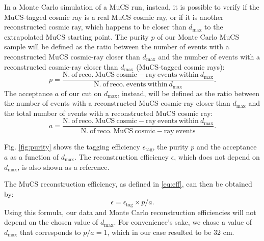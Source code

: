 \documentclass[a4paper]{scrartcl}
\begin{document}
In a Monte Carlo simulation of a MuCS run, instead, it is possible to verify if the MuCS-tagged cosmic ray is a real MuCS cosmic ray, or if it is another reconstructed cosmic ray, which happens to be closer than $d_{\mathrm{max}}$ to the extrapolated MuCS starting point.
The purity $p$ of our Monte Carlo MuCS sample will be defined as the ratio between the number of events with a reconstructed MuCS cosmic-ray closer than $d_{\mathrm{max}}$ and the number of events with a reconstructed cosmic-ray closer than $d_{\mathrm{max}}$ (MuCS-tagged cosmic rays):
\begin{equation}
  p=\frac{\mathrm{N.~of~reco.~MuCS~cosmic-ray~events~within~}d_{\mathrm{max}}}{\mathrm{N.~of~reco.~events~within~}d_{\mathrm{max}}}.
\end{equation}
The acceptance $a$ of our cut on $d_{\mathrm{max}}$, instead, will be defined as the ratio between the number of events with a reconstructed MuCS cosmic-ray closer than $d_{\mathrm{max}}$ and the total number of events with a reconstructed MuCS cosmic ray:
\begin{equation}
  a=\frac{\mathrm{N.~of~reco.~MuCS~cosmic-ray~events~within~}d_{\mathrm{max}}}{\mathrm{N.~of~reco.~MuCS~cosmic-ray~events}}.
\end{equation}

Fig. \ref{fig:purity} shows the tagging efficiency $\epsilon_{\mathrm{tag}}$, the purity $p$ and the acceptance $a$ as a function of $d_{\mathrm{max}}$. The reconstruction efficiency $\epsilon$, which does not depend on $d_{\mathrm{max}}$, is also shown as a reference.

The MuCS reconstruction efficiency, as defined in \eqref{eq:eff}, can then be obtained by:
\begin{equation}
  \epsilon = \epsilon_{\mathrm{tag}} \times p / a.
\end{equation}
Using this formula, our data and Monte Carlo reconstruction efficiencies will not depend on the chosen value of $d_{\mathrm{max}}$. For convenience's sake, we chose a value of $d_{\mathrm{max}}$ that corresponds to $p/a = 1$, which in our case resulted to be 32 cm.
\end{document}
